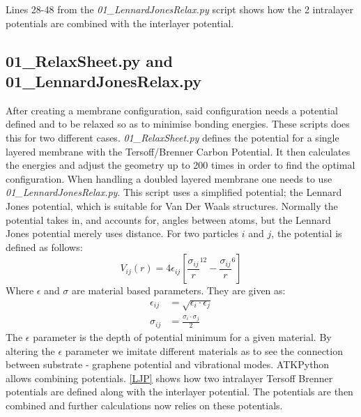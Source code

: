 \begin{listing}[H]
 \inputminted[python3=true,bgcolor=Black,linenos=true,firstline=28,lastline=48]{python}{VNL/PythonScripts/Scripts/01_LennardJonesRelax.py}
 \caption{Lines 28-48 from the \textit{01\_LennardJonesRelax.py} script shows how the 2 intralayer potentials are combined with the interlayer potential.}
 \label{LJP}
\end{listing}
\twocolumngrid
\subsection{01\_RelaxSheet.py and 01\_LennardJonesRelax.py}\label{01}
After creating a membrane configuration, said configuration needs a potential defined and to be relaxed so as to minimise bonding energies. These scripts does this for two different cases. \textit{01\_RelaxSheet.py} defines the potential for a single layered membrane with the Tersoff/Brenner Carbon Potential\cite{Lindsay2010}. It then calculates the energies and adjust the geometry up to 200 times in order to find the optimal configuration. When handling a doubled layered membrane one needs to use \textit{01\_LennardJonesRelax.py}. This script uses a simplified potential; the Lennard Jones potential, which is suitable for Van Der Waals structures. Normally the potential takes in, and accounts for, angles between atoms, but the Lennard Jones potential merely uses distance. For two particles $i$ and $j$, the potential is defined as follows:
\begin{equation}
  V_{ij}(r) = 4 \epsilon_{ij} \left[ \frac{\sigma_{ij}}{r}^{12} - \frac{\sigma_{ij}}{r}^6 \right]
\end{equation}
Where $\epsilon$ and $\sigma$ are material based parameters. They are given as:
\begin{align}
  \epsilon_{ij} & = \sqrt{\epsilon_i \cdot \epsilon_j} \\
  \sigma_{ij} & = \frac{\sigma_i \cdot \sigma_j}{2}
\end{align}
The $\epsilon$ parameter is the depth of potential minimum for a given material.
By altering the $\epsilon$ parameter we imitate different materials as to see the connection between substrate - graphene potential and vibrational modes.
ATKPython allows combining potentials. \cref{LJP} shows how two intralayer Tersoff Brenner potentials are defined along with the interlayer potential. The potentials are then combined and further calculations now relies on these potentials.
